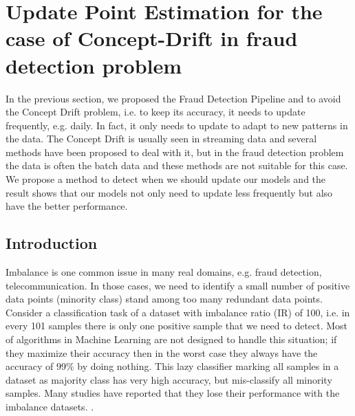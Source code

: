 \chapter{Update Point Estimation for the case of Concept-Drift in fraud detection problem}

\ifpdf
    \graphicspath{{Chapter4/Figs/Raster/}{Chapter4/Figs/PDF/}{Chapter4/Figs/}}
\else
    \graphicspath{{Chapter4/Figs/Vector/}{Chapter4/Figs/}}
\fi


In the previous section, we proposed the Fraud Detection Pipeline and to avoid the Concept Drift problem, i.e. to keep its accuracy, it needs to update frequently, e.g. daily. In fact, it only needs to update to adapt to new patterns in the data. The Concept Drift is usually seen in streaming data and several methods have been proposed to deal with it, but in the fraud detection problem the data is often the batch data and these methods are not suitable for this case. We propose a method to detect when we should update our models and the result shows that our models not only need to update less frequently but also have the better performance.


\section{Introduction}

Imbalance is one common issue in many real domains, e.g. fraud detection, telecommunication. In those cases, we need to identify a small number of positive data points (minority class) stand among too many redundant data points. Consider a classification task of a dataset with imbalance ratio (IR) of 100, i.e. in every 101 samples there is only one positive sample that we need to detect. Most of algorithms in Machine Learning are not designed to handle this situation; if they maximize their accuracy then in the worst case they always have the accuracy of 99\% by doing nothing. This lazy classifier marking all samples in a dataset as majority class has very high accuracy, but mis-classify all minority samples. Many studies have reported that they lose their performance with the imbalance datasets. \cite{chen2004using,chen2005pruning,wang2006classification,hong2007kernel}.

